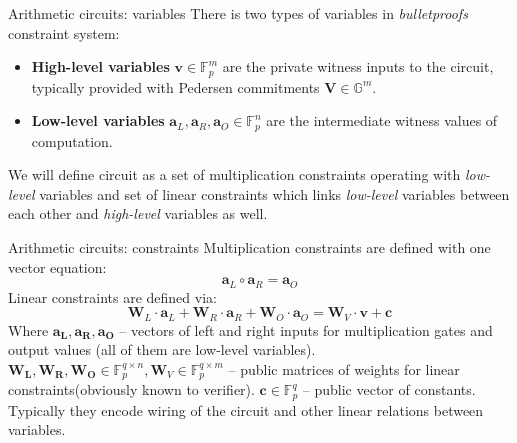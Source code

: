 \documentclass{zkdl-presentation-template}
\begin{document}
\begin{frame}{Arithmetic circuits: variables}
    There is two types of variables in \textit{bulletproofs} constraint system:
    \begin{itemize}
        \item \textbf{High-level variables} $\mathbf{v} \in \mathbb{F}_p^m$ are the private witness inputs to the circuit, typically provided with Pedersen commitments $\mathbf{V} \in \mathbb{G}^m$.
        \item \textbf{Low-level variables} $\mathbf{a}_L, \mathbf{a}_R, \mathbf{a}_O \in \mathbb{F}_p^n$ are the intermediate witness values of computation.
    \end{itemize}
    We will define circuit as a set of multiplication constraints operating with \textit{low-level} variables and set of linear constraints which links \textit{low-level} variables between each other and \textit{high-level} variables as well.
\end{frame}

\begin{frame}{Arithmetic circuits: constraints}
    Multiplication constraints are defined with one vector equation:
    $$ \mathbf{a}_L \circ \mathbf{a}_R = \mathbf{a}_O $$
    Linear constraints are defined via:
    $$ \mathbf{W}_L \cdot \mathbf{a}_L + \mathbf{W}_R \cdot \mathbf{a}_R + \mathbf{W}_O \cdot \mathbf{a}_O = \mathbf{W}_V \cdot \mathbf{v} + \mathbf{c} $$
    Where $\mathbf{a_L, a_R, a_O}$ -- vectors of left and right inputs for multiplication gates and output values (all of them are low-level variables). $\mathbf{W_L, W_R, W_O} \in \mathbb{F}_p^{q \times n}, \mathbf{W}_V \in \mathbb{F}_p^{q \times m}$ -- public matrices of weights for linear constraints(obviously known to verifier). $\mathbf{c} \in \mathbb{F}_p^q$ -- public vector of constants. Typically they encode wiring of the circuit and other linear relations between variables.
\end{frame}
\end{document}
